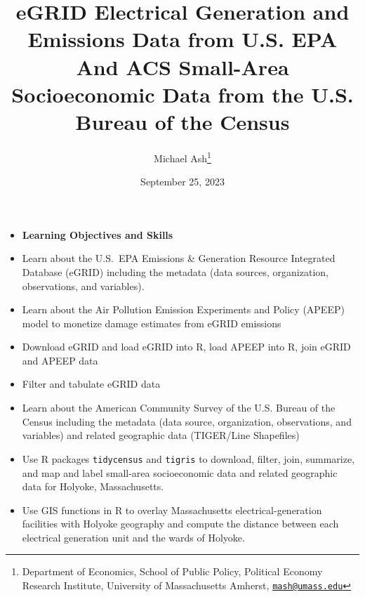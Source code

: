 \documentclass[fleqn, 12pt]{exam}
\title{eGRID Electrical Generation and Emissions Data from U.S. EPA\\ And ACS Small-Area Socioeconomic Data from the U.S. Bureau of the Census}
\author{Michael Ash\thanks{Department of Economics, School of Public Policy, Political Economy Research Institute, University of Massachusetts Amherst, \href{mailto:mash@umass.edu}{\tt mash@umass.edu}}}
\date{September 25, 2023}
\begin{document}
\maketitle
\thispagestyle{empty}

\begin{center}
\end{center}


  \begin{itemize}
  \item \textbf{Learning Objectives and Skills}
  \item Learn about the U.S.~EPA Emissions \& Generation Resource Integrated Database (eGRID) including the metadata (data sources, organization, observations, and variables).
  \item Learn about the Air Pollution Emission Experiments and Policy (APEEP) model to monetize damage estimates from eGRID emissions
  \item Download eGRID and load eGRID into R, load APEEP into R, join eGRID and APEEP data
  \item Filter and tabulate eGRID data
  \item Learn about the American Community Survey of the U.S. Bureau of the Census including the metadata (data source, organization, observations, and variables) and related geographic data (TIGER/Line Shapefiles)
  \item Use R packages \texttt{tidycensus} and \texttt{tigris} to download, filter, join, summarize, and map and label small-area socioeconomic data and related geographic data for Holyoke, Massachusetts. 
  \item Use GIS functions in R to overlay Massachusetts electrical-generation facilities with Holyoke geography and compute the distance between each electrical generation unit and the wards of Holyoke. 
  \end{itemize}
\end{document}
